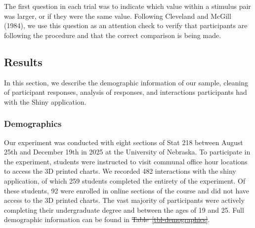 \documentclass[
  letterpaper,
  DIV=11,
  numbers=noendperiod]{scrartcl}
\makeatletter
\providecommand{\DIFadd}[1]{{\protect\color{blue}\uwave{#1}}} %
\providecommand{\DIFdel}[1]{{\protect\color{red}\sout{#1}}} %
\providecommand{\DIFaddbegin}{} %
\providecommand{\DIFaddend}{} %
\providecommand{\DIFdelbegin}{} %
\providecommand{\DIFdelend}{} %
\providecommand{\DIFscaledelfig}{0.5}
\newlength{\DIFdelgraphicswidth} %
\newlength{\DIFdelgraphicsheight} %
\providecommand{\DIFaddincludegraphics}[2][]{{\color{blue}\fbox{\DIFOincludegraphics[#1]{#2}}}} %
\providecommand{\DIFdelincludegraphics}[2][]{%
\sbox{\DIFdelgraphicsbox}{\DIFOincludegraphics[#1]{#2}}%
\settoboxwidth{\DIFdelgraphicswidth}{\DIFdelgraphicsbox} %
\settoboxtotalheight{\DIFdelgraphicsheight}{\DIFdelgraphicsbox} %
\scalebox{\DIFscaledelfig}{%
\parbox[b]{\DIFdelgraphicswidth}{\usebox{\DIFdelgraphicsbox}\\[-\baselineskip] \rule{\DIFdelgraphicswidth}{0em}}\llap{\resizebox{\DIFdelgraphicswidth}{\DIFdelgraphicsheight}{%
\setlength{\unitlength}{\DIFdelgraphicswidth}%
\begin{picture}(1,1)%
\thicklines\linethickness{2pt} %
{\color[rgb]{1,0,0}\put(0,0){\framebox(1,1){}}}%
{\color[rgb]{1,0,0}\put(0,0){\line( 1,1){1}}}%
{\color[rgb]{1,0,0}\put(0,1){\line(1,-1){1}}}%
\end{picture}%
}\hspace*{3pt}}} %
} %
\DeclareRobustCommand{\DIFaddbegin}{\DIFOaddbegin \let\includegraphics\DIFaddincludegraphics} %
\DeclareRobustCommand{\DIFaddend}{\DIFOaddend \let\includegraphics\DIFOincludegraphics} %
\DeclareRobustCommand{\DIFdelbegin}{\DIFOdelbegin \let\includegraphics\DIFdelincludegraphics} %
\DeclareRobustCommand{\DIFdelend}{\DIFOaddend \let\includegraphics\DIFOincludegraphics} %
\let\sout@orig\sout %
\renewcommand{\sout}[1]{\ifmmode\text{\sout@orig{\ensuremath{#1}}}\else\sout@orig{#1}\fi} %
\makeatother
\begin{document}
The first question in each trial was to indicate which value within a
stimulus pair was larger, or if they were the same value. Following
Cleveland and McGill (1984), we use this question as an attention check
to verify that participants are following the procedure and that the
correct comparison is being made.

\subsection{Results}\label{results}

In this section, we describe the demographic information of our sample,
cleaning of participant responses, analysis of responses, and
interactions participants had with the Shiny application.

\subsubsection{Demographics}\label{demographics}

Our experiment was conducted with eight sections of Stat 218 between
August 25th and December 19th in 2025 at the University of Nebraska. To
participate in the experiment, students were instructed to visit
communal office hour locations to access the 3D printed charts. We
recorded 482 interactions with the shiny application, of which 259
students completed the entirety of the experiment. Of these students, 92
were enrolled in online sections of the course and did not have access
to the 3D printed charts. The vast majority of participants were
actively completing their undergraduate degree and between the ages of
19 and 25. Full demographic information can be found in
\DIFdelbegin \DIFdel{Table~\ref{tbl-demographics}}\DIFdelend \DIFaddbegin \textbf{\DIFadd{?@tbl-demographics}}\DIFaddend .

\DIFdelbegin %

{%
}

\end{document}
